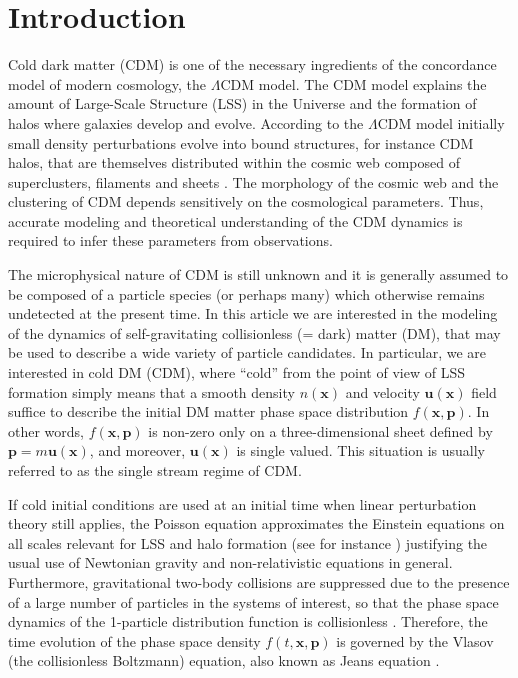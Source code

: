 \documentclass[twocolumn, nofootinbib, showpacs, superscriptaddress]{revtex4-1}
\renewcommand{\v}[1]{\bm{#1} }
\newcommand{\vx}[0]{\bm{x} }
\newcommand{\vu}[0]{\bm{u} }
\begin{document}
\maketitle
{\small 
\tableofcontents
}

\maketitle
\section{Introduction}

Cold dark matter (CDM)  is one of the necessary ingredients of the concordance model of modern cosmology, the  $\Lambda$CDM model.
The CDM model explains the amount of Large-Scale Structure (LSS) in the Universe 
and the formation of halos where galaxies develop and evolve. 
According to the $\Lambda$CDM model initially small density perturbations evolve into bound structures, for instance CDM halos, 
that are themselves distributed within the cosmic web composed of superclusters, filaments and sheets \cite{P80,SWF05,TSM13}. 
The morphology of the cosmic web and the clustering of CDM depends sensitively on the cosmological parameters.
Thus, accurate modeling and theoretical understanding of the CDM dynamics is required to infer these parameters from observations.

The microphysical nature of CDM is still unknown and it is generally assumed to be composed of a particle species (or perhaps many)
 which otherwise remains undetected  at the present time.
In this article we are interested in the modeling of the dynamics of self-gravitating collisionless (= dark)  matter (DM), 
 that may be used to describe a wide variety of particle candidates. In particular, we are interested in cold DM (CDM), 
where ``cold'' from the point of view of LSS formation simply means that  a smooth density $n(\vx)$ and velocity $\vu(\vx)$ field suffice to describe the initial DM matter phase space distribution $f(\vx,\v{p})$. In other words, $f(\vx,\v{p})$ is non-zero only on a three-dimensional sheet defined by $\v{p}=m\v{u}(\vx)$, and moreover, $\vu(\vx)$ is single valued.
This situation is usually referred to as the single stream regime of CDM.


If cold initial conditions are used at an initial time when linear perturbation theory still applies, 
the Poisson equation approximates the Einstein equations on all scales relevant 
 for LSS and halo formation (see for instance \cite{CZ11,GW12}) justifying the usual use of Newtonian gravity 
and non-relativistic equations in general.  Furthermore,  gravitational two-body collisions are suppressed 
due to the presence of a large number of particles in the systems of interest, so that the phase space dynamics 
of the 1-particle distribution function is collisionless  \cite{G68}.
Therefore, the time evolution of the phase space density $f(t,\v{x},\v{p})$ is governed by the Vlasov (the collisionless Boltzmann) equation, 
also known as Jeans equation \cite{Jeans1915}. 
\end{document}
